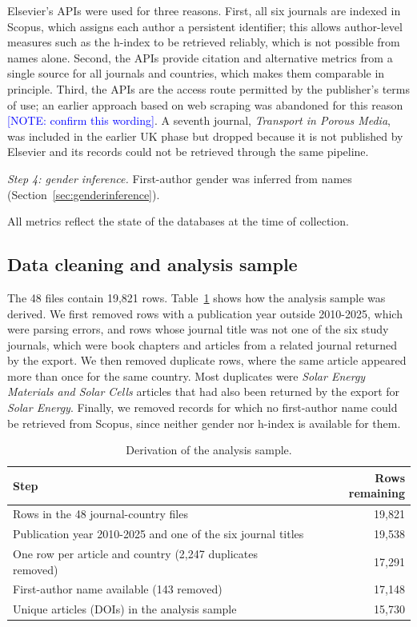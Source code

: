 \documentclass[preprint,12pt,number]{elsarticle}
\newcommand{\note}[1]{\textcolor{blue}{[NOTE: #1]}}
\begin{document}
Elsevier's APIs were used for three reasons. First, all six journals are indexed in Scopus, which assigns each author a persistent identifier; this allows author-level measures such as the h-index to be retrieved reliably, which is not possible from names alone. Second, the APIs provide citation and alternative metrics from a single source for all journals and countries, which makes them comparable in principle. Third, the APIs are the access route permitted by the publisher's terms of use; an earlier approach based on web scraping was abandoned for this reason \note{confirm this wording}. A seventh journal, \textit{Transport in Porous Media}, was included in the earlier UK phase but dropped because it is not published by Elsevier and its records could not be retrieved through the same pipeline.

\textit{Step 4: gender inference.} First-author gender was inferred from names (Section~\ref{sec:genderinference}).

All metrics reflect the state of the databases at the time of collection.

\subsection{Data cleaning and analysis sample}

The 48 files contain 19,821 rows. Table~\ref{tab:cleaning} shows how the analysis sample was derived. We first removed rows with a publication year outside 2010-2025, which were parsing errors, and rows whose journal title was not one of the six study journals, which were book chapters and articles from a related journal returned by the export. We then removed duplicate rows, where the same article appeared more than once for the same country. Most duplicates were \textit{Solar Energy Materials and Solar Cells} articles that had also been returned by the export for \textit{Solar Energy}. Finally, we removed records for which no first-author name could be retrieved from Scopus, since neither gender nor h-index is available for them.

\begin{table}[htbp]
\centering
\caption{Derivation of the analysis sample.}
\label{tab:cleaning}
\begin{tabular}{lr}
\toprule
Step & Rows remaining \\
\midrule
Rows in the 48 journal-country files & 19,821 \\
Publication year 2010-2025 and one of the six journal titles & 19,538 \\
One row per article and country (2,247 duplicates removed) & 17,291 \\
First-author name available (143 removed) & 17,148 \\
\midrule
Unique articles (DOIs) in the analysis sample & 15,730 \\
\bottomrule
\end{tabular}
\end{table}
\end{document}
